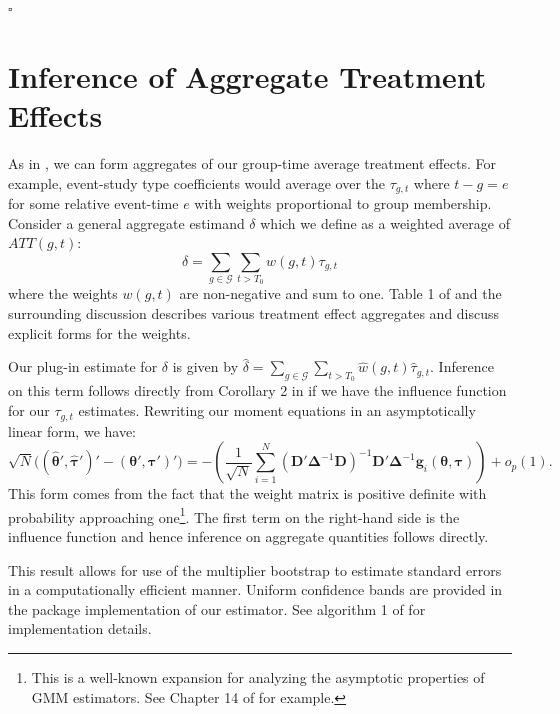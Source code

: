 \documentclass[12pt]{article}
\begin{document}
$\square$


\section{Inference of Aggregate Treatment Effects}\label{sec:agg_te}

As in \citet{Callaway_Santanna_2021}, we can form aggregates of our group-time average treatment effects. For example, event-study type coefficients would average over the $\tau_{g,t}$ where $t - g = e$ for some relative event-time $e$ with weights proportional to group membership. Consider a general aggregate estimand $\delta$ which we define as a weighted average of $ATT(g,t)$:
\begin{equation}
\delta = \sum_{g\in \mathcal{G}} \sum_{t > T_0} w(g,t) \tau_{g,t}
\end{equation}
where the weights $w(g,t)$ are non-negative and sum to one. Table 1 of \citet{Callaway_Santanna_2021} and the surrounding discussion describes various treatment effect aggregates and discuss explicit forms for the weights. 

Our plug-in estimate for $\delta$ is given by $\hat{\delta} = \sum_{g\in \mathcal{G}} \sum_{t > T_0} \hat{w}(g,t) \hat{\tau}_{g,t}$. Inference on this term follows directly from Corollary 2 in \citet{Callaway_Santanna_2021} if we have the influence function for our $\tau_{g,t}$ estimates. Rewriting our moment equations in an asymptotically linear form, we have:
\begin{equation}
    \sqrt{N}\Big( (\widehat{\bm{\theta}}', \widehat{\bm \tau}')' - (\bm{\theta}', \bm \tau')' \Big) = - \left( \frac{1}{\sqrt{N}} \sum_{i = 1}^N (\bm D' \bm \Delta^{-1} \bm D)^{-1} \bm D' \bm \Delta^{-1} \bm g_i(\bm{\theta}, \bm \tau) \right) + o_p(1).
\end{equation}
This form comes from the fact that the weight matrix is positive definite with probability approaching one\footnote{This is a well-known expansion for analyzing the asymptotic properties of GMM estimators. See Chapter 14 of \citet{Wooldridge_2010} for example.}. The first term on the right-hand side is the influence function and hence inference on aggregate quantities follows directly. 

This result allows for use of the multiplier bootstrap to estimate standard errors in a computationally efficient manner. 
Uniform confidence bands are provided in the package implementation of our estimator. 
See algorithm 1 of \citet{Callaway_Santanna_2021} for implementation details. 
\end{document}
